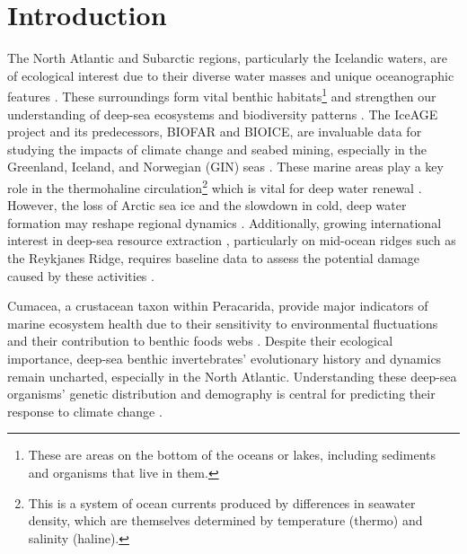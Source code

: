 \section{Introduction}\label{introduction}
The North Atlantic and Subarctic regions, particularly the Icelandic waters, are of ecological interest due to their diverse water masses and unique oceanographic features \citep{schnurr_composition_2014, meisner_benthic_2014, uhlir_adding_2021}. These surroundings form vital {benthic habitats}\footnote{These are areas on the bottom of the oceans or lakes, including sediments and organisms that live in them.} \citep{levin2009ecological} and strengthen our understanding of deep-sea ecosystems and biodiversity patterns \citep{rogers2007corals, danovaro2008exponential, uhlir_adding_2021}. The IceAGE project and its predecessors, BIOFAR and BIOICE, are invaluable data for studying the impacts of climate change and seabed mining, especially in the Greenland, Iceland, and Norwegian (GIN) seas \citep{meisner_prefacebiodiversity_2018}.  
These marine areas play a key role in the {thermohaline circulation}\footnote{This is a system of ocean currents produced by differences in seawater density, which are themselves determined by temperature (thermo) and salinity (haline).} which is vital for deep water renewal \citep{johannessen_relationship_1994, talley2013closure}. However, the loss of Arctic sea ice and the slowdown in cold, deep water formation may reshape regional dynamics \citep{meisner_prefacebiodiversity_2018}. Additionally, growing international interest in deep-sea resource extraction \citep{mengerink_call_2014}, particularly on mid-ocean ridges such as the Reykjanes Ridge, requires baseline data to assess the potential damage caused by these activities \citep{meisner_prefacebiodiversity_2018}. 

Cumacea, a crustacean taxon within Peracarida, provide major indicators of marine ecosystem health due to their sensitivity to environmental fluctuations \citep{stransky_diversity_2010} and their contribution to benthic foods webs \citep{rehm2009cumacea}. Despite their ecological importance, deep-sea benthic invertebrates’ evolutionary history and dynamics remain uncharted, especially in the North Atlantic. Understanding these deep-sea organisms' genetic distribution and demography is central for predicting their response to climate change \citep{jennings_phylogeographic_2014}. 

